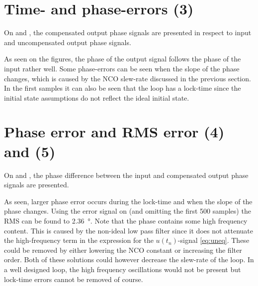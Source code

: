 \section{Time- and phase-errors (3)}
On  and , the compensated output phase signals are presented in respect to input and uncompensated output phase signals.


As seen on the figures, the phase of the output signal follows the phase of the input rather well. Some phase-errors can be seen when the slope of the phase changes, which is caused by the NCO slew-rate discussed in the previous section. In the first samples it can also be seen that the loop has a lock-time since the initial state assumptions do not reflect the ideal initial state.

\section{Phase error and RMS error (4) and (5)}
On  and , the phase difference between the input and compensated output phase signals are presented.


As seen, larger phase error occurs during the lock-time and when the slope of the phase changes. Using the error signal on  (and omitting the first 500 samples) the RMS can be found to \SI{2.36}{\degree}. Note that the phase contains some high frequency content. This is caused by the non-ideal low pass filter since it does not attenuate the high-frequency term in the expression for the $u(t_n)$-signal \eqref{eq:uneq}. These could be removed by either lowering the NCO constant or increasing the filter order. Both of these solutions could however decrease the slew-rate of the loop. In a well designed loop, the high frequency oscillations would not be present but lock-time errors cannot be removed of course.

